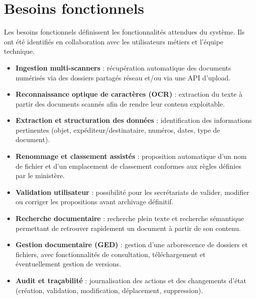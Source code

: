 \documentclass[12pt,a4paper]{report}
\begin{document}
\section{Besoins fonctionnels}
Les besoins fonctionnels définissent les fonctionnalités attendues du système. Ils ont été identifiés en collaboration avec les utilisateurs métiers et l’équipe technique.
\begin{itemize}
  \item \textbf{Ingestion multi-scanners} : récupération automatique des documents numérisés via des dossiers partagés réseau et/ou via une API d’upload.
  \item \textbf{Reconnaissance optique de caractères (OCR)} : extraction du texte à partir des documents scannés afin de rendre leur contenu exploitable.
  \item \textbf{Extraction et structuration des données} : identification des informations pertinentes (objet, expéditeur/destinataire, numéros, dates, type de document).
  \item \textbf{Renommage et classement assistés} : proposition automatique d’un nom de fichier et d’un emplacement de classement conformes aux règles définies par le ministère.
  \item \textbf{Validation utilisateur} : possibilité pour les secrétariats de valider, modifier ou corriger les propositions avant archivage définitif.
  \item \textbf{Recherche documentaire} : recherche plein texte et recherche sémantique permettant de retrouver rapidement un document à partir de son contenu.
  \item \textbf{Gestion documentaire (GED)} : gestion d’une arborescence de dossiers et fichiers, avec fonctionnalités de consultation, téléchargement et éventuellement gestion de versions.
  \item \textbf{Audit et traçabilité} : journalisation des actions et des changements d’état (création, validation, modification, déplacement, suppression).
\end{itemize}
\end{document}
